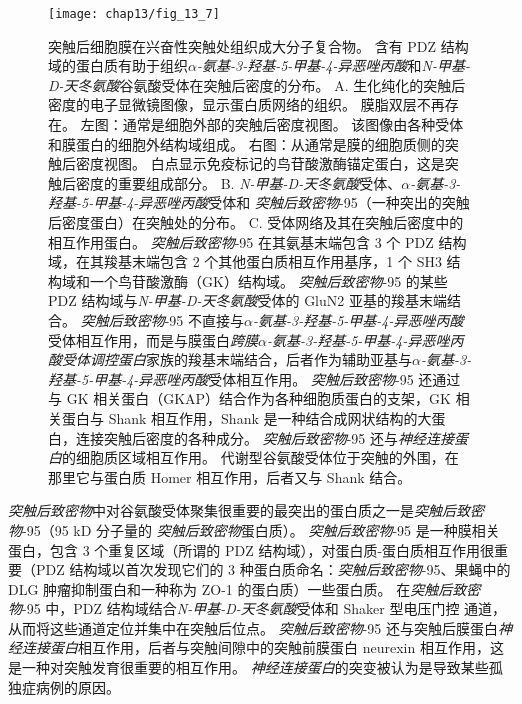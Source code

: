 \begin{figure}[htbp]
	\centering
	\texttt{[image: chap13/fig\_13\_7]}
	\caption{突触后细胞膜在兴奋性突触处组织成大分子复合物。
		含有 PDZ 结构域的蛋白质有助于组织\textit{$\alpha$-氨基-3-羟基-5-甲基-4-异恶唑丙酸}和\textit{N-甲基-D-天冬氨酸}谷氨酸受体在突触后密度的分布\cite{sheng2007postsynaptic}。
		A. 生化纯化的突触后密度的电子显微镜图像，显示蛋白质网络的组织。
		膜脂双层不再存在。
		左图：通常是细胞外部的突触后密度视图。
		该图像由各种受体和膜蛋白的细胞外结构域组成。
		右图：从通常是膜的细胞质侧的突触后密度视图。
		白点显示免疫标记的鸟苷酸激酶锚定蛋白，这是突触后密度的重要组成部分。
		B. \textit{N-甲基-D-天冬氨酸}受体、\textit{$\alpha$-氨基-3-羟基-5-甲基-4-异恶唑丙酸}受体和 \textit{突触后致密物}-95（一种突出的突触后密度蛋白）在突触处的分布。
		C. 受体网络及其在突触后密度中的相互作用蛋白。
		\textit{突触后致密物}-95 在其氨基末端包含 3 个 PDZ 结构域，在其羧基末端包含 2 个其他蛋白质相互作用基序，1 个 SH3 结构域和一个鸟苷酸激酶（GK）结构域。
		\textit{突触后致密物}-95 的某些 PDZ 结构域与\textit{N-甲基-D-天冬氨酸}受体的 GluN2 亚基的羧基末端结合。
		\textit{突触后致密物}-95 不直接与\textit{$\alpha$-氨基-3-羟基-5-甲基-4-异恶唑丙酸}受体相互作用，而是与膜蛋白\textit{跨膜$\alpha$-氨基-3-羟基-5-甲基-4-异恶唑丙酸受体调控蛋白}家族的羧基末端结合，后者作为辅助亚基与\textit{$\alpha$-氨基-3-羟基-5-甲基-4-异恶唑丙酸}受体相互作用。
		\textit{突触后致密物}-95 还通过与 GK 相关蛋白（GKAP）结合作为各种细胞质蛋白的支架，GK 相关蛋白与 Shank 相互作用，Shank 是一种结合成网状结构的大蛋白，连接突触后密度的各种成分。
		\textit{突触后致密物}-95 还与\textit{神经连接蛋白}的细胞质区域相互作用。
		代谢型谷氨酸受体位于突触的外围，在那里它与蛋白质 Homer 相互作用，后者又与 Shank 结合。}
	\label{fig:13_7}
\end{figure}


\textit{突触后致密物}中对谷氨酸受体聚集很重要的最突出的蛋白质之一是\textit{突触后致密物}-95（95 kD 分子量的 \textit{突触后致密物}蛋白质）。
\textit{突触后致密物}-95 是一种膜相关蛋白，包含 3 个重复区域（所谓的 PDZ 结构域），对蛋白质-蛋白质相互作用很重要（PDZ 结构域以首次发现它们的 3 种蛋白质命名：\textit{突触后致密物}-95、果蝇中的 DLG 肿瘤抑制蛋白和一种称为 ZO-1 的蛋白质）一些蛋白质。
在\textit{突触后致密物}-95 中，PDZ 结构域结合\textit{N-甲基-D-天冬氨酸}受体和 Shaker 型电压门控  通道，从而将这些通道定位并集中在突触后位点。
\textit{突触后致密物}-95 还与突触后膜蛋白\textit{神经连接蛋白}相互作用，后者与突触间隙中的突触前膜蛋白 neurexin 相互作用，这是一种对突触发育很重要的相互作用。
\textit{神经连接蛋白}的突变被认为是导致某些孤独症病例的原因。


